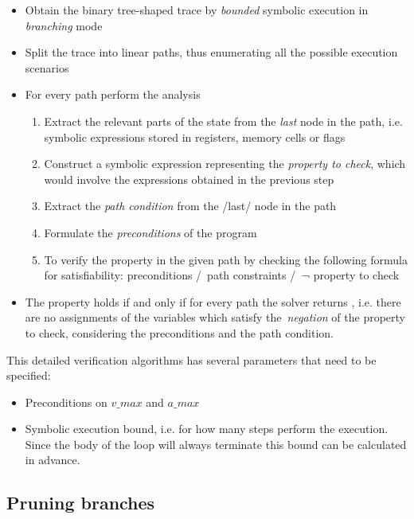 \begin{itemize}
  \item Obtain the binary tree-shaped trace by \emph{bounded} symbolic execution
  in \emph{branching} mode
  \item Split the trace into linear paths, thus enumerating all the possible
    execution scenarios
  \item For every path perform the analysis
    \begin{enumerate}
      \item Extract the relevant parts of the state from the \emph{last} node in
            the path, i.e. symbolic expressions stored in
            registers, memory cells or flags
      \item Construct a symbolic expression representing the \emph{property to check},
            which would involve the expressions obtained in the previous step
      \item Extract the \emph{path condition} from the /last/ node in the path
      \item Formulate the \emph{preconditions} of the program
      \item To verify the property in the given path by checking the following
            formula for satisfiability:
              preconditions /\ path constraints /\ ¬ property to check
    \end{enumerate}
    \item  The property holds if and only if for every path the solver returns
           , i.e. there are no assignments of the variables which
           satisfy the~\emph{negation} of the property to check, considering the
           preconditions and the path condition.
\end{itemize}

This detailed verification algorithms has several parameters that need to be specified:

\begin{itemize}
\item Preconditions on $v\_max$ and $a\_max$
\item Symbolic execution bound, i.e. for how many steps perform the execution. Since the
      body of the loop will always terminate this bound can be calculated in advance.
\end{itemize}

\subsection{Pruning branches}


